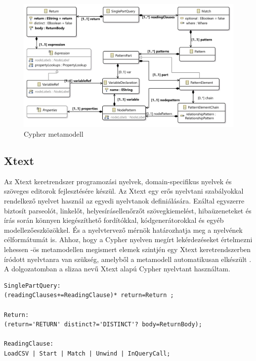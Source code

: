 \begin{figure}
	\centering
	\includegraphics[width=1\textwidth]{figures/openCypherClassDiagram}
	\caption{Cypher metamodell}
	\label{fig:cyphermetamodell}
\end{figure}


\subsection{Xtext}

Az Xtext keretrendszer programozási nyelvek,  domain-specifikus nyelvek és szöveges editorok fejlesztésére készül. Az Xtext  
egy erős nyelvtani szabályokkal rendelkező nyelvet használ az egyedi nyelvtanok definiálására. Ezáltal
egyszerre biztosít parseolót, linkelőt, helyesírásellenőrzőt szövegkiemelést, hibaüzeneteket és  írás során könnyen kiegészíthető fordítókkal, kódgenerátorokkal és egyéb modellezőeszközökkel. És a nyelvtervező mérnök határozhatja meg a nyelvének célformátumát is. Ahhoz, hogy a Cypher nyelven megírt lekérdezéseket értelmezni lehessen 
-ös metamodellen megismert elemek szintjén egy Xtext \cite{xText} keretrendszerben íródott nyelvtanra van szükség, amelyből a metamodell automatikusan elkészült . A dolgozatomban a slizaa \cite{slizaa_2018} nevű Xtext alapú Cypher nyelvtant használtam.


\begin{lstlisting}[style=cyphersmall]
SinglePartQuery:
(readingClauses+=ReadingClause)* return=Return ;

Return:
(return='RETURN' distinct?='DISTINCT'? body=ReturnBody);

ReadingClause:
LoadCSV | Start | Match | Unwind | InQueryCall;
\end{lstlisting}



